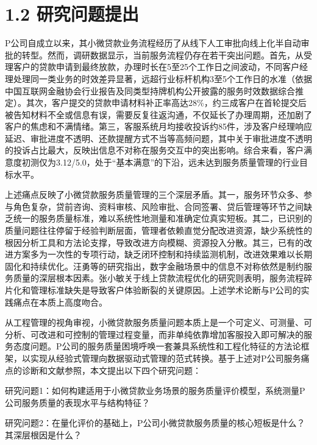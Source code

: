 \section{1.2 研究问题提出}

P公司自成立以来，其小微贷款业务流程经历了从线下人工审批向线上化半自动审批的转型。然而，调研数据显示，当前服务流程仍存在若干突出问题。首先，从受理客户的贷款申请到最终放款，办理时长在5至25个工作日之间波动，不同客户经理处理同一类业务的时效差异显著，远超行业标杆机构3至5个工作日的水准（依据中国互联网金融协会行业报告及同类型持牌机构公开披露的服务时效数据综合推定）。其次，客户提交的贷款申请材料补正率高达28\%，约三成客户在首轮提交后被告知材料不全或信息有误，需要反复往返沟通，不仅延长了办理周期，还加剧了客户的焦虑和不满情绪。第三，客服系统月均接收投诉约85件，涉及客户经理响应延迟、审批进度不透明、还款提醒方式不当等高频问题，其中关于审批进度不透明的投诉占比最大，反映出信息不对称在服务交互中的突出影响。综合来看，客户满意度初测仅为3.12/5.0，处于“基本满意”的下沿，远未达到服务质量管理的行业目标水平。\par

上述痛点反映了小微贷款服务质量管理的三个深层矛盾。其一，服务环节众多、参与角色复杂，贷前咨询、资料审核、风险审批、合同签署、贷后管理等环节之间缺乏统一的服务质量标准，难以系统性地测量和准确定位真实短板。其二，已识别的质量问题往往停留于经验判断层面，管理者依赖直觉分配改进资源，缺少系统性的根因分析工具和方法论支撑，导致改进方向模糊、资源投入分散。其三，已有的改进方案多为一次性的专项行动，缺乏闭环控制和持续监测机制，改进效果难以长期固化和持续优化。汪勇等的研究指出，数字金融场景中的信息不对称依然是制约服务质量的深层根本因素\cite{ref10}。张小敏关于线上贷款流程优化的研究则表明，服务流程碎片化和管理标准缺失是导致客户体验断裂的关键原因\cite{ref11}。上述学术论断与P公司的实践痛点在本质上高度吻合。\par

从工程管理的视角审视，小微贷款服务质量问题本质上是一个可定义、可测量、可分析、可改进和可控制的管理过程变量，而非单纯依靠增加客服投入即可解决的服务态度问题。P公司的服务质量困境呼唤一套兼具系统性和工程化特征的方法论框架，以实现从经验式管理向数据驱动式管理的范式转换。基于上述对P公司服务痛点的诊断和文献参照，本文提出以下四个研究问题：\par

研究问题1：如何构建适用于小微贷款业务场景的服务质量评价模型，系统测量P公司服务质量的表现水平与结构特征？\par

研究问题2：在量化评价的基础上，P公司小微贷款服务质量的核心短板是什么？其深层根因是什么？\par


